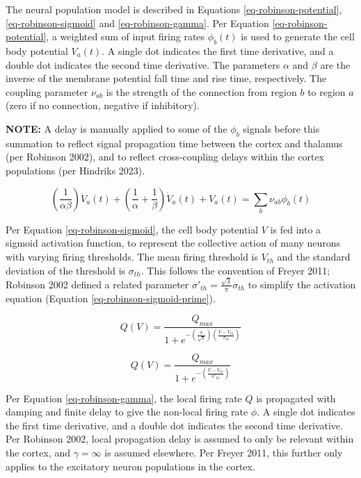 The neural population model is described in Equations
\ref{eq-robinson-potential}, \ref{eq-robinson-sigmoid} and
\ref{eq-robinson-gamma}.
%
Per Equation \ref{eq-robinson-potential}, a weighted sum of input firing
rates $\phi_b(t)$ is used to generate the cell body potential $V_a(t)$. A
single dot indicates the first time derivative, and a double dot indicates
the second time derivative. The parameters $\alpha$ and $\beta$ are the
inverse of the membrane potential fall time and rise time, respectively.
The coupling parameter $\nu_{ab}$ is the strength of the connection from
region $b$ to region $a$ (zero if no connection, negative if inhibitory).

\textbf{NOTE:} A delay is manually applied to some of the $\phi_b$ signals
before this summation to reflect signal propagation time between the cortex
and thalamus (per Robinson 2002), and to reflect cross-coupling delays
within the cortex populations (per Hindriks 2023).

\begin{equation}
\left ( \frac{1}{\alpha \beta} \right ) \ddot{V}_a(t)
+ \left ( \frac{1}{\alpha} + \frac{1}{\beta} \right ) \dot{V}_a(t)
+ V_a(t) = \sum_b \nu_{ab} \phi_b(t)
\label{eq-robinson-potential}
\end{equation}

Per Equation \ref{eq-robinson-sigmoid}, the cell body potential $V$ is fed
into a sigmoid activation function, to represent the collective action of
many neurons with varying firing thresholds. The mean firing threshold is
$V_{th}$ and the standard deviation of the threshold is $\sigma_{th}$.
This follows the convention of Freyer 2011; Robinson 2002 defined a
related parameter $\sigma'_{th} = \frac{\sqrt{3}}{\pi} \sigma_{th}$ to
simplify the activation equation (Equation \ref{eq-robinson-sigmoid-prime}).

\begin{equation}
Q(V) = \frac{Q_{max}}
{1 + e^{- \left ( \frac{\pi}{\sqrt{3}} \right )
\left ( \frac{ V - V_{th}}{\sigma_{th}} \right )}}
\label{eq-robinson-sigmoid}
\end{equation}

\begin{equation}
Q(V) = \frac{Q_{max}}
{1 + e^{- \left ( \frac{ V - V_{th}}{\sigma'_{th}} \right )}}
\label{eq-robinson-sigmoid-prime}
\end{equation}

Per Equation \ref{eq-robinson-gamma}, the local firing rate $Q$ is
propagated with damping and finite delay to give the non-local firing rate
$\phi$. A single dot indicates the first time derivative, and a double dot
indicates the second time derivative. Per Robinson 2002, local propagation
delay is assumed to only be relevant within the cortex, and
$\gamma = \infty$ is assumed elsewhere. Per Freyer 2011, this further only
applies to the excitatory neuron populations in the cortex.

